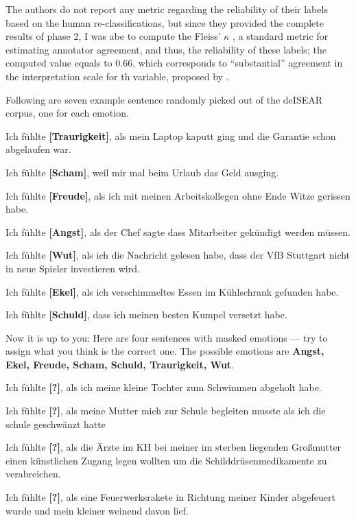 The authors do not report any metric regarding the reliability of their labels based on the human
re-classifications, but since they provided the complete results of phase 2, I was abe to compute
the Fleiss' $\kappa$ \citep{fleiss1973equivalence}, a standard metric for estimating annotator
agreement, and thus, the reliability of these labels; the computed value equals to 0.66, which
corresponds to ``substantial'' agreement in the interpretation scale for th variable, proposed by
\cite{landis1977measurement}.


Following are seven example sentence randomly picked out of the deISEAR corpus, one for each emotion.

\begin{examples}
  \item Ich fühlte \textbf{[Traurigkeit]}, als mein Laptop kaputt ging und die Garantie schon abgelaufen war.
  \item Ich fühlte \textbf{[Scham]}, weil mir mal beim Urlaub das Geld ausging.
  \item Ich fühlte \textbf{[Freude]}, als ich mit meinen Arbeitskollegen ohne Ende Witze gerissen habe.
  \item Ich fühlte \textbf{[Angst]}, als der Chef sagte dass Mitarbeiter gekündigt werden müssen.
  \item Ich fühlte \textbf{[Wut]}, als ich die Nachricht gelesen habe, dass der VfB Stuttgart nicht in neue Spieler investieren wird.
  \item Ich fühlte \textbf{[Ekel]}, als ich verschimmeltes Essen im Kühlschrank gefunden habe.
  \item Ich fühlte \textbf{[Schuld]}, dass ich meinen besten Kumpel versetzt habe.
\end{examples}

Now it is up to you: Here are four sentences with masked emotions --- try to assign what you think is the correct one.
The possible emotions are \textbf{Angst, Ekel, Freude, Scham, Schuld, Traurigkeit, Wut}.


\begin{examples}
  \item \label{itm:deisear1} Ich fühlte \textbf{[?]}, als ich meine kleine Tochter zum Schwimmen abgeholt habe.
  \item \label{itm:deisear2} Ich fühlte \textbf{[?]}, als meine Mutter mich zur Schule begleiten musste als ich die schule geschwänzt hatte
  \item \label{itm:deisear3} Ich fühlte \textbf{[?]}, als die Ärzte im KH bei meiner im sterben liegenden Großmutter einen künstlichen Zugang legen wollten um die Schilddrüsenmedikamente zu verabreichen.
  \item \label{itm:deisear4} Ich fühlte \textbf{[?]}, als eine Feuerwerksrakete in Richtung meiner Kinder abgefeuert wurde und mein kleiner weinend davon lief.
\end{examples}


